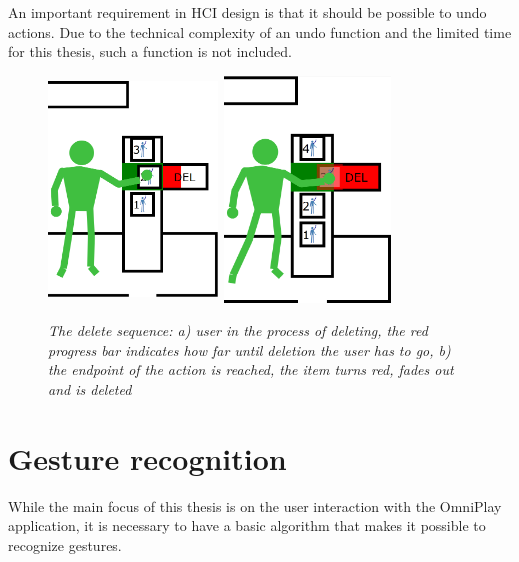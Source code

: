 An important requirement in HCI design is that it should be possible to undo actions. Due to the technical complexity of an undo function and the limited time for this thesis, such a function is not included.\\

\begin{figure}[H]
	\begin{center}
		\includegraphics[width=4.5cm, height=6cm]{figures/12_delete_progress.png}
		\includegraphics[width=4.5cm, height=6cm]{figures/13_delete_complete.png}
		\caption{\emph{The delete sequence: a) user in the process of deleting, the red progress bar indicates how far until deletion the user has to go, b) the endpoint of the action is reached, the item turns red, fades out and is deleted}}
		\label{delete functionality}
	\end{center}
\end{figure}


\section{Gesture recognition}

While the main focus of this thesis is on the user interaction with the OmniPlay application, it is necessary to have a basic algorithm that makes it possible to recognize gestures.\\

